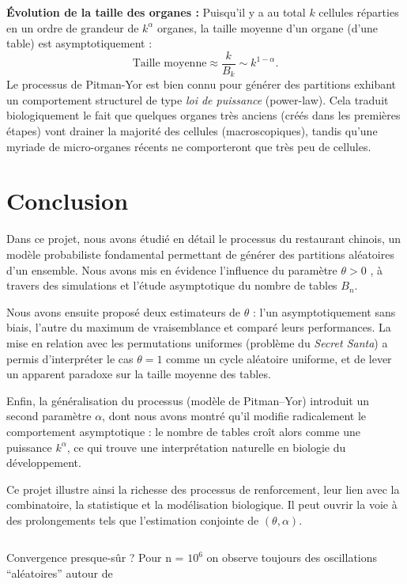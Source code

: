 \documentclass[12pt, a4paper]{article}
\theoremstyle{definition}
\theoremstyle{plain}
\begin{document}
\textbf{Évolution de la taille des organes :}
Puisqu'il y a au total $k$ cellules réparties en un ordre de grandeur de $k^{\alpha}$ organes, la taille moyenne d'un organe (d'une table) est asymptotiquement :
$$ \text{Taille moyenne} \approx \frac{k}{B_{k}} \sim k^{1-\alpha}. $$
Le processus de Pitman-Yor est bien connu pour générer des partitions exhibant un comportement structurel de type \textit{loi de puissance} (power-law). Cela traduit biologiquement le fait que quelques organes très anciens (créés dans les premières étapes) vont drainer la majorité des cellules (macroscopiques), tandis qu'une myriade de micro-organes récents ne comporteront que très peu de cellules.

\section*{Conclusion}

Dans ce projet, nous avons étudié en détail le processus du restaurant chinois, un modèle probabiliste fondamental permettant de générer des partitions aléatoires d’un ensemble. Nous avons mis en évidence l’influence du paramètre $\theta > 0$ , à travers des simulations et l’étude asymptotique du nombre de tables $B_n$.

Nous avons ensuite proposé deux estimateurs de $\theta$ : l’un asymptotiquement sans biais, l’autre du maximum de vraisemblance et comparé leurs performances. La mise en relation avec les permutations uniformes (problème du \textit{Secret Santa}) a permis d’interpréter le cas $\theta = 1$ comme un cycle aléatoire uniforme, et de lever un apparent paradoxe sur la taille moyenne des tables.

Enfin, la généralisation du processus (modèle de Pitman–Yor) introduit un second paramètre $\alpha$, dont nous avons montré qu’il modifie radicalement le comportement asymptotique : le nombre de tables croît alors comme une puissance $k^\alpha$, ce qui trouve une interprétation naturelle en biologie du développement.

Ce projet illustre ainsi la richesse des processus de renforcement, leur lien avec la combinatoire, la statistique et la modélisation biologique. Il peut ouvrir la voie à des prolongements tels que l’estimation conjointe de $(\theta, \alpha)$.


$$$$

Convergence presque-sûr ?
Pour n = $10^{6}$
on observe toujours des oscillations “aléatoires” autour de \theta
\end{document}
